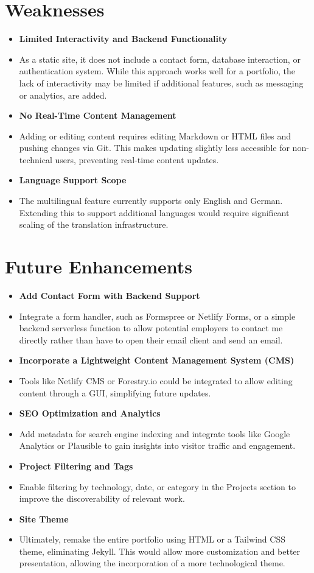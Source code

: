 \section{Weaknesses}
\begin{itemize}
	\item \textbf{Limited Interactivity and Backend Functionality}
	\item[ ] As a static site, it does not include a contact form, database interaction, or authentication system. While this approach works well for a portfolio, the lack of interactivity may be limited if additional features, such as messaging or analytics, are added.
	\item \textbf{No Real-Time Content Management}
	\item[ ] Adding or editing content requires editing Markdown or HTML files and pushing changes via Git. This makes updating slightly less accessible for non-technical users, preventing real-time content updates.
	\item \textbf{Language Support Scope}
	\item[ ] The multilingual feature currently supports only English and German. Extending this to support additional languages would require significant scaling of the translation infrastructure.
\end{itemize}

\section{Future Enhancements}
\begin{itemize}
	\item \textbf{Add Contact Form with Backend Support}
	\item[ ] Integrate a form handler, such as Formspree or Netlify Forms, or a simple backend serverless function to allow potential employers to contact me directly rather than have to open their email client and send an email.
	\item \textbf{Incorporate a Lightweight Content Management System (CMS)}
	\item[ ] Tools like Netlify CMS or Forestry.io could be integrated to allow editing content through a GUI, simplifying future updates.
	\item \textbf{SEO Optimization and Analytics}
	\item[ ] Add metadata for search engine indexing and integrate tools like Google Analytics or Plausible to gain insights into visitor traffic and engagement.
	\item \textbf{Project Filtering and Tags}
	\item[ ] Enable filtering by technology, date, or category in the Projects section to improve the discoverability of relevant work.
	\item \textbf{Site Theme}
	\item[ ] Ultimately, remake the entire portfolio using HTML or a Tailwind CSS theme, eliminating Jekyll. This would allow more customization and better presentation, allowing the incorporation of a more technological theme.
\end{itemize}\par
